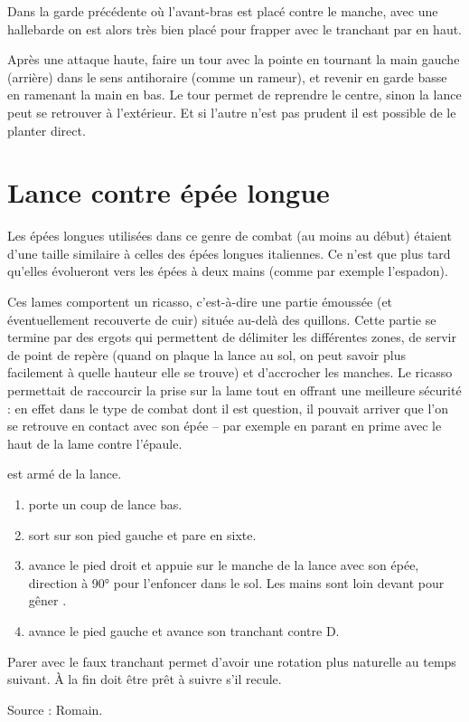 Dans la garde précédente où l'avant-bras est placé contre le manche, avec une hallebarde on est alors très bien placé pour frapper avec le tranchant par en haut.

\begin{technique}
Après une attaque haute, faire un tour avec la pointe en tournant la main gauche (arrière) dans le sens antihoraire (comme un rameur), et revenir en garde basse en ramenant la main en bas.
Le tour permet de reprendre le centre, sinon la lance peut se retrouver à l'extérieur.
Et si l'autre n'est pas prudent il est possible de le planter direct.
\end{technique}


\section{Lance contre épée longue}

Les épées longues utilisées dans ce genre de combat (au moins au début) étaient d'une taille similaire à celles des épées longues italiennes.
Ce n'est que plus tard qu'elles évolueront vers les épées à deux mains (comme par exemple l'espadon).

Ces lames comportent un ricasso, c'est-à-dire une partie émoussée (et éventuellement recouverte de cuir) située au-delà des quillons.
Cette partie se termine par des ergots qui permettent de délimiter les différentes zones, de servir de point de repère (quand on plaque la lance au sol, on peut savoir plus facilement à quelle hauteur elle se trouve) et d'accrocher les manches.
Le ricasso permettait de raccourcir la prise sur la lame tout en offrant une meilleure sécurité : en effet dans le type de combat dont il est question, il pouvait arriver que l'on se retrouve en contact avec son épée – par exemple en parant en prime avec le haut de la lame contre l'épaule.


\begin{technique}

\A est armé de la lance.

\begin{enumerate}
	\item \A porte un coup de lance bas.
	
	\item \D sort sur son pied gauche et pare en sixte.
	
	\item \D avance le pied droit et appuie sur le manche de la lance avec son épée, direction à 90° pour l'enfoncer dans le sol.
	Les mains sont loin devant pour gêner \A.
	
	\item \D avance le pied gauche et avance son tranchant contre D.
\end{enumerate}

Parer avec le faux tranchant permet d'avoir une rotation plus naturelle au temps suivant. 
À la fin \D doit être prêt à suivre \A s'il recule.

Source : Romain.
\end{technique}


